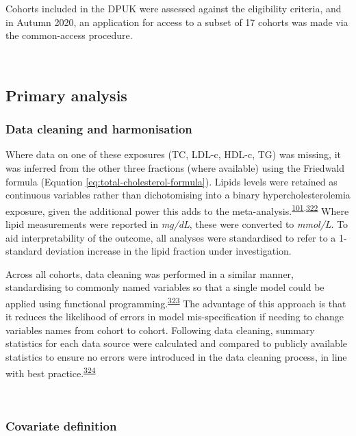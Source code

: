 \documentclass[a4paper, twoside]{templates/ociamthesis}
\begin{document}
Cohorts included in the DPUK were assessed against the eligibility criteria, and in Autumn 2020, an application for access to a subset of 17 cohorts was made via the common-access procedure.

~

\hypertarget{primary-analysis-1}{%
\subsection{Primary analysis}\label{primary-analysis-1}}

\hypertarget{data-cleaning-and-harmonisation}{%
\subsubsection{Data cleaning and harmonisation}\label{data-cleaning-and-harmonisation}}

Where data on one of these exposures (TC, LDL-c, HDL-c, TG) was missing, it was inferred from the other three fractions (where available) using the Friedwald formula (Equation \eqref{eq:total-cholesterol-formula}). Lipids levels were retained as continuous variables rather than dichotomising into a binary hypercholesterolemia exposure, given the additional power this adds to the meta-analysis.\textsuperscript{\protect\hyperlink{ref-riley2020}{101},\protect\hyperlink{ref-ensor2018}{322}} Where lipid measurements were reported in \emph{mg/dL}, these were converted to \emph{mmol/L}. To aid interpretability of the outcome, all analyses were standardised to refer to a 1-standard deviation increase in the lipid fraction under investigation.

Across all cohorts, data cleaning was performed in a similar manner, standardising to commonly named variables so that a single model could be applied using functional programming.\textsuperscript{\protect\hyperlink{ref-wickham2016func}{323}} The advantage of this approach is that it reduces the likelihood of errors in model mis-specification if needing to change variables names from cohort to cohort. Following data cleaning, summary statistics for each data source were calculated and compared to publicly available statistics to ensure no errors were introduced in the data cleaning process, in line with best practice.\textsuperscript{\protect\hyperlink{ref-levis2021}{324}}

~

\hypertarget{covariate-definition}{%
\subsubsection{Covariate definition}\label{covariate-definition}}
\end{document}
